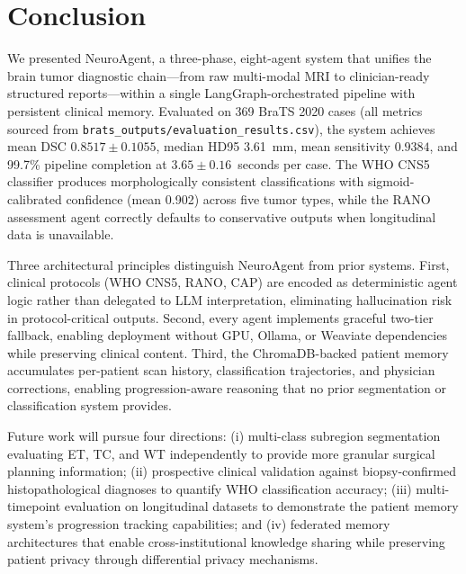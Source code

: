 \section{Conclusion}

We presented NeuroAgent, a three-phase, eight-agent system that unifies the brain tumor diagnostic chain---from raw multi-modal MRI to clinician-ready structured reports---within a single LangGraph-orchestrated pipeline with persistent clinical memory. Evaluated on 369 BraTS 2020 cases (all metrics sourced from \texttt{brats\_outputs/evaluation\_results.csv}), the system achieves mean DSC $0.8517 \pm 0.1055$, median HD95 3.61~mm, mean sensitivity $0.9384$, and 99.7\% pipeline completion at $3.65 \pm 0.16$~seconds per case. The WHO CNS5 classifier produces morphologically consistent classifications with sigmoid-calibrated confidence (mean 0.902) across five tumor types, while the RANO assessment agent correctly defaults to conservative outputs when longitudinal data is unavailable.

Three architectural principles distinguish NeuroAgent from prior systems. First, clinical protocols (WHO CNS5, RANO, CAP) are encoded as deterministic agent logic rather than delegated to LLM interpretation, eliminating hallucination risk in protocol-critical outputs. Second, every agent implements graceful two-tier fallback, enabling deployment without GPU, Ollama, or Weaviate dependencies while preserving clinical content. Third, the ChromaDB-backed patient memory accumulates per-patient scan history, classification trajectories, and physician corrections, enabling progression-aware reasoning that no prior segmentation or classification system provides.

Future work will pursue four directions: (i) multi-class subregion segmentation evaluating ET, TC, and WT independently to provide more granular surgical planning information; (ii) prospective clinical validation against biopsy-confirmed histopathological diagnoses to quantify WHO classification accuracy; (iii) multi-timepoint evaluation on longitudinal datasets to demonstrate the patient memory system's progression tracking capabilities; and (iv) federated memory architectures that enable cross-institutional knowledge sharing while preserving patient privacy through differential privacy mechanisms.
